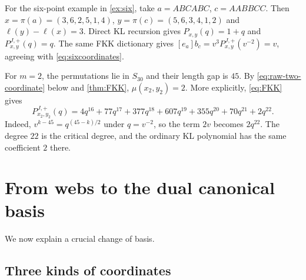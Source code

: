 \documentclass[a4paper,11pt]{amsart}
\newcommand{\qpar}{q}
\newcommand{\tpar}{v}
\numberwithin{equation}{subsection}
\theoremstyle{plain}
\theoremstyle{definition}
\theoremstyle{remark}
\begin{document}
\begin{example}
For the six-point example in \autoref{ex:six}, take
$a=ABCABC$, $c=AABBCC$. Then
$x=\pi(a)=(3,6,2,5,1,4)$, $y=\pi(c)=(5,6,3,4,1,2)$ and
$\ell(y)-\ell(x)=3$. Direct KL recursion gives $P_{x,y}(\qpar)=1+\qpar$
and $P^{J,+}_{x,y}(\qpar)=\qpar$. The same FKK dictionary gives
$[e_a]b_c=\tpar^3P^{J,+}_{x,y}(\tpar^{-2})=\tpar$, agreeing with
\autoref{eq:sixcoordinates}.
\end{example}

\begin{example}\label{ex:fkk-two}
For $m=2$, the permutations lie in $S_{30}$ and their length gap
is $45$. By \autoref{eq:raw-two-coordinate} below and
\autoref{thm:FKK}, $\mu(x_2,y_2)=2$.
More explicitly, \autoref{eq:FKK} gives
\[
P^{J,+}_{x_2,y_2}(\qpar)
=4\qpar^{16}+77\qpar^{17}+377\qpar^{18}+607\qpar^{19}
+355\qpar^{20}+70\qpar^{21}+2\qpar^{22}.
\]
Indeed, $\tpar^{k-45}=\qpar^{(45-k)/2}$ under $\qpar=\tpar^{-2}$,
so the term $2\tpar$
becomes $2\qpar^{22}$. The degree $22$ is the critical degree,
and the ordinary KL polynomial has the same coefficient $2$ there.
\end{example}

\section{From webs to the dual canonical basis}\label{sec:basischange}

We now explain a crucial change of basis.

\subsection{Three kinds of coordinates}
\end{document}
